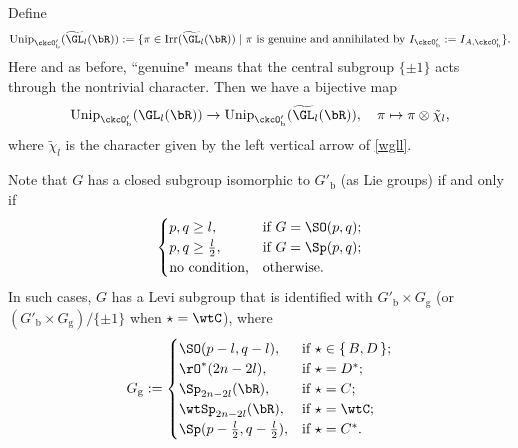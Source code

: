 \documentclass[12pt,a4paper]{amsart}
\newcommand{\oO}{\operatorname{O}}
\newcommand{\R}{\mathbb R}
\numberwithin{equation}{section}
\theoremstyle{remark}
\def\Irr{\mathrm{Irr}}
\def\Unip{\mathrm{Unip}}
\def\ckcOpb{\ckcO'_{\mathrm b}}
\def\Gpb{G'_{\mathrm b}}
\def\Gg{G_{\mathrm g}}
\begin{document}
Define
 \[
      \Unip_{\ckcOpb}(\widetilde{ \GL}_{l}(\bR)):=
       \{\pi\in \Irr(\widetilde{ \GL}_{l}(\bR))\mid \pi \textrm{ is genuine  and annihilated by } I_{\ckcOpb}:= I_{A, \ckcOpb}\}.
       \]
        Here and as before, ``genuine" means that the central subgroup $\{\pm 1\}$ acts through the nontrivial character.  Then we have a bijective map
 \[
    \Unip_{\ckcOpb}(\GL_{l}(\bR))\rightarrow  \Unip_{\ckcOpb}(\widetilde{ \GL}_{l}(\bR)), \quad \pi\mapsto \pi\otimes \tilde \chi_l,
 \]
 where $\tilde \chi_l$ is the character given by the left vertical arrow of \eqref{wgll}.

Note that $G$ has a closed subgroup isomorphic to $\Gpb$ (as Lie groups) if and only if
\[
  \begin{cases}
    p,q\geq l, & \text{if $G = \SO(p,q)$};\\
    p,q\geq \frac{l}{2}, &  \text{if $G = \Sp(p,q)$};\\
    \text{no condition,} & \text{otherwise}.
  \end{cases}
\]
In such cases, $G$ has a Levi subgroup that is identified with $\Gpb\times \Gg$ (or   $(\Gpb\times \Gg)/\{\pm 1\} $ when $\star=\wtC$), where
\[
  \Gg :=
  \begin{cases}
    \SO(p-l,q-l), & \textrm{if $\star\in \set{B,D}$};\\
    \rO^{*}(2n-2l), &\textrm{if $\star = D^{*}$};\\
    \Sp_{2n-2l}(\bR), &\textrm{if $\star = C$};\\
    \wtSp_{2n-2l}(\bR), &\textrm{if $\star = \wtC$};\\
    \Sp(p-\frac{l}{2},q-\frac{l}{2}), &\textrm{if $\star = C^{*}$}.\\
  \end{cases}
\]
\end{document}
